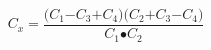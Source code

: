 \[C_x\mathrm{=}\frac{\mathrm{(}C_{\mathrm{1}}\mathrm{-}C_{\mathrm{3}}\mathrm{+}C_{\mathrm{4}}\mathrm{)(}C_{\mathrm{2}}\mathrm{+}C_{\mathrm{3}}\mathrm{-}C_{\mathrm{4}}\mathrm{)}}{C_{\mathrm{1}}\mathrm{\bullet }C_{\mathrm{2}}}\]